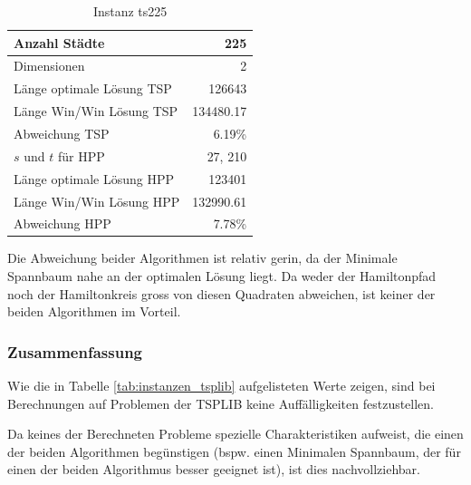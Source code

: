 \documentclass[11pt,a4paper]{article}
\begin{document}
        \begin{table}[H]
                \centering
                \begin{tabular}{| l | r |}
                    \hline
                        Anzahl Städte               & 225           \\ \hline
                        Dimensionen                 & 2             \\ \hline
                        Länge optimale Lösung TSP   & 126643        \\ \hline
                        Länge Win/Win Lösung  TSP   & 134480.17     \\ \hline
                        Abweichung TSP              & 6.19\%        \\ \hline
                        $s$ und $t$ für HPP         & 27, 210       \\ \hline
                        Länge optimale Lösung HPP   & 123401        \\ \hline
                        Länge Win/Win Lösung  HPP   & 132990.61     \\ \hline
                        Abweichung HPP              & 7.78\%        \\ \hline
                \end{tabular}
                \caption{Instanz ts225}
                \label{tab:ts225}
        \end{table}
Die Abweichung beider Algorithmen ist relativ gerin, da der Minimale Spannbaum nahe an der optimalen Lösung liegt. Da weder der Hamiltonpfad noch der Hamiltonkreis gross von diesen Quadraten abweichen, ist keiner der beiden Algorithmen im Vorteil.

\subsubsection{Zusammenfassung}
Wie die in Tabelle \ref{tab:instanzen_tsplib} aufgelisteten Werte zeigen, sind bei Berechnungen auf Problemen der TSPLIB keine Auffälligkeiten festzustellen.

Da keines der Berechneten Probleme spezielle Charakteristiken aufweist, die einen der beiden Algorithmen begünstigen (bspw. einen Minimalen Spannbaum, der für einen der beiden Algorithmus besser geeignet ist), ist dies nachvollziehbar.
\end{document}

